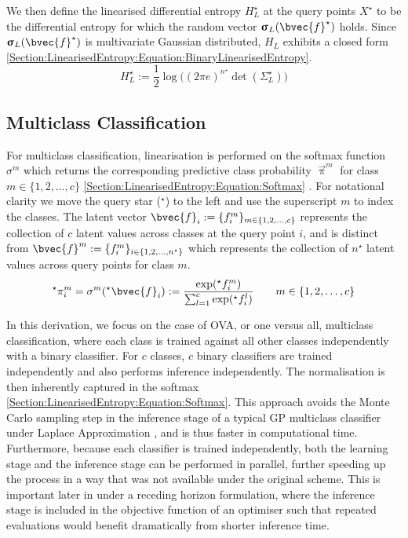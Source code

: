 				We then define the linearised differential entropy $H^{\star}_{L}$ at the query points $X^{\star}$ to be the differential entropy for which the random vector $\vec{\upsigma}_{L}(\bvec{f}^{\star})$ holds. Since $\vec{\upsigma}_{L}(\bvec{f}^{\star})$ is multivariate Gaussian distributed, $H_{L}$ exhibits a closed form \eqref{Section:LinearisedEntropy:Equation:BinaryLinearisedEntropy}. \begin{equation}
					H^{\star}_{L} := \frac{1}{2} \log\Big((2 \pi e)^{n^{\star}} \det(\Sigma^{\star}_{L})\Big)
				\label{Section:LinearisedEntropy:Equation:BinaryLinearisedEntropy}
				\end{equation}			
						
		\subsection{Multiclass Classification}
				
			For multiclass classification, linearisation is performed on the softmax function $\sigma^{m}$ which returns the corresponding predictive class probability $\vec{\uppi}^{m}$ for class $m \in \{1, 2, \dots, c\}$ \eqref{Section:LinearisedEntropy:Equation:Softmax} \cite{GaussianProcessForMachineLearning}. For notational clarity we move the query star ($^\star$) to the left and use the superscript $m$ to index the classes. The latent vector $\bvec{f}_{i} := \{f^{m}_{i}\}_{m \in \{1, 2, \dots, c\}}$ represents the collection of $c$ latent values across classes at the query point $i$, and is distinct from $\bvec{f}^{m} := \{f^{m}_{i}\}_{i \in \{1, 2, \dots, n^{\star}\}}$ which represents the collection of $n^{\star}$ latent values across query points for class $m$. \begin{equation}
				^{\star}\pi^{m}_{i} = \sigma^{m}(^{\star}\bvec{f}_{i}) := \frac{\exp(^{\star}f^{m}_{i})}{\sum_{l = 1}^{c} \exp(^{\star}f^{l}_{i})} \qquad m \in \{1, 2, \dots, c\}
			\label{Section:LinearisedEntropy:Equation:Softmax}
			\end{equation}
			
			In this derivation, we focus on the case of OVA, or one versus all, multiclass classification, where each class is trained against all other classes independently with a binary classifier. For $c$ classes, $c$ binary classifiers are trained independently and also performs inference independently. The normalisation is then inherently captured in the softmax \eqref{Section:LinearisedEntropy:Equation:Softmax}. This approach avoids the Monte Carlo sampling step in the inference stage of a typical GP multiclass classifier under Laplace Approximation \cite{GaussianProcessForMachineLearning}, and is thus faster in computational time. Furthermore, because each classifier is trained independently, both the learning stage and the inference stage can be performed in parallel, further speeding up the process in a way that was not available under the original scheme. This is important later in under a receding horizon formulation, where the inference stage is included in the objective function of an optimiser such that repeated evaluations would benefit dramatically from shorter inference time.
			
